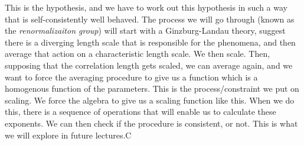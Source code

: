 This is the hypothesis, and we have to work out this hypothesis in such a way that is self-consistently well behaved. The process we will go through (known as the \emph{renormalizaiton group}) will start with a Ginzburg-Landau theory, suggest there is a diverging length scale that is responsible for the phenomena, and then average that action on a characteristic length scale. We then scale. Then, supposing that the correlation length gets scaled, we can average again, and we want to force the averaging procedure to give us a function which is a homogenous function of the parameters. This is the process/constraint we put on scaling. We force the algebra to give us a scaling function like this. When we do this, there is a sequence of operations that will enable us to calculate these exponents. We can then check if the procedure is consistent, or not. This is what we will explore in future lectures.C